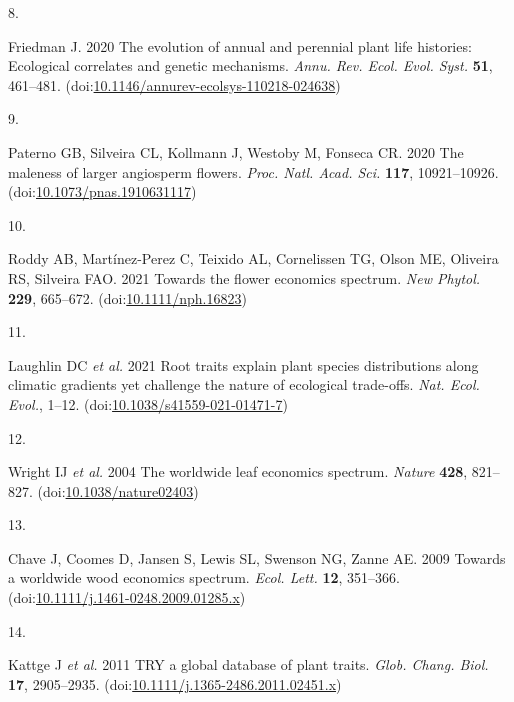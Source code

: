 \documentclass[
  12pt,
  a4paper,
]{article}
\newlength{\cslhangindent}
\newlength{\csllabelwidth}
\newlength{\cslentryspacingunit} %
\newenvironment{CSLReferences}[2] %
 {%
  \setlength{\parindent}{0pt}
  \ifodd #1
  \let\oldpar\par
  \def\par{\hangindent=\cslhangindent\oldpar}
  \fi
  \setlength{\parskip}{#2\cslentryspacingunit}
 }%
 {}
\newcommand{\CSLLeftMargin}[1]{\parbox[t]{\csllabelwidth}{#1}}
\newcommand{\CSLRightInline}[1]{\parbox[t]{\linewidth - \csllabelwidth}{#1}\break}
\begin{document}
\begin{CSLReferences}{0}{0}
\leavevmode{}%
\CSLLeftMargin{8. }
\CSLRightInline{Friedman J. 2020 The evolution of annual and perennial plant life histories: Ecological correlates and genetic mechanisms. \emph{Annu. Rev. Ecol. Evol. Syst.} \textbf{51}, 461--481. (doi:\href{https://doi.org/10.1146/annurev-ecolsys-110218-024638}{10.1146/annurev-ecolsys-110218-024638})}

\leavevmode{}%
\CSLLeftMargin{9. }
\CSLRightInline{Paterno GB, Silveira CL, Kollmann J, Westoby M, Fonseca CR. 2020 The maleness of larger angiosperm flowers. \emph{Proc. Natl. Acad. Sci.} \textbf{117}, 10921--10926. (doi:\href{https://doi.org/10.1073/pnas.1910631117}{10.1073/pnas.1910631117})}

\leavevmode{}%
\CSLLeftMargin{10. }
\CSLRightInline{Roddy AB, Martínez-Perez C, Teixido AL, Cornelissen TG, Olson ME, Oliveira RS, Silveira FAO. 2021 Towards the flower economics spectrum. \emph{New Phytol.} \textbf{229}, 665--672. (doi:\href{https://doi.org/10.1111/nph.16823}{10.1111/nph.16823})}

\leavevmode{}%
\CSLLeftMargin{11. }
\CSLRightInline{Laughlin DC \emph{et al.} 2021 Root traits explain plant species distributions along climatic gradients yet challenge the nature of ecological trade-offs. \emph{Nat. Ecol. Evol.}, 1--12. (doi:\href{https://doi.org/10.1038/s41559-021-01471-7}{10.1038/s41559-021-01471-7})}

\leavevmode{}%
\CSLLeftMargin{12. }
\CSLRightInline{Wright IJ \emph{et al.} 2004 The worldwide leaf economics spectrum. \emph{Nature} \textbf{428}, 821--827. (doi:\href{https://doi.org/10.1038/nature02403}{10.1038/nature02403})}

\leavevmode{}%
\CSLLeftMargin{13. }
\CSLRightInline{Chave J, Coomes D, Jansen S, Lewis SL, Swenson NG, Zanne AE. 2009 Towards a worldwide wood economics spectrum. \emph{Ecol. Lett.} \textbf{12}, 351--366. (doi:\href{https://doi.org/10.1111/j.1461-0248.2009.01285.x}{10.1111/j.1461-0248.2009.01285.x})}

\leavevmode{}%
\CSLLeftMargin{14. }
\CSLRightInline{Kattge J \emph{et al.} 2011 {TRY} \textendash{} a global database of plant traits. \emph{Glob. Chang. Biol.} \textbf{17}, 2905--2935. (doi:\href{https://doi.org/10.1111/j.1365-2486.2011.02451.x}{10.1111/j.1365-2486.2011.02451.x})}


\end{CSLReferences}
\end{document}
